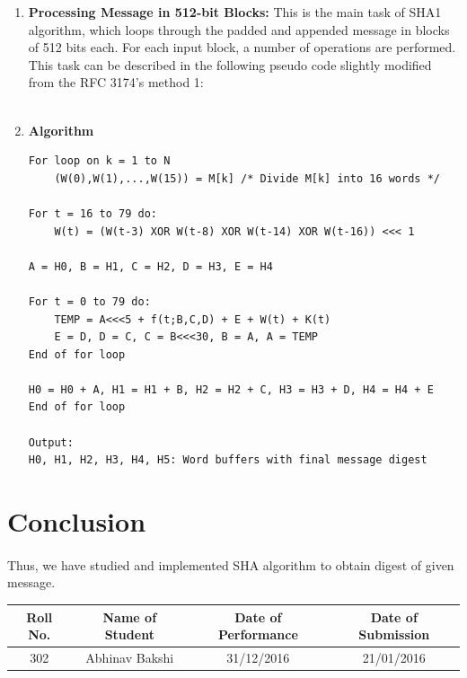 \documentclass[a4paper,12pt]{article}
\begin{document}
\begin{enumerate}
        \vspace{30px}
        
        \item \textbf{Processing Message in 512-bit Blocks:} This is the main task of SHA1 algorithm, which loops through the padded and appended message in blocks of 512 bits each. For each input block, a number of operations are performed. This task can be described in the following pseudo code slightly modified from the RFC 3174's method 1:\\\\
        
        \item \textbf{Algorithm}
	\lstset{language=Python}
\begin{lstlisting}
For loop on k = 1 to N
	(W(0),W(1),...,W(15)) = M[k] /* Divide M[k] into 16 words */

For t = 16 to 79 do:
	W(t) = (W(t-3) XOR W(t-8) XOR W(t-14) XOR W(t-16)) <<< 1

A = H0, B = H1, C = H2, D = H3, E = H4

For t = 0 to 79 do:
	TEMP = A<<<5 + f(t;B,C,D) + E + W(t) + K(t)
	E = D, D = C, C = B<<<30, B = A, A = TEMP
End of for loop

H0 = H0 + A, H1 = H1 + B, H2 = H2 + C, H3 = H3 + D, H4 = H4 + E
End of for loop

Output: 
H0, H1, H2, H3, H4, H5: Word buffers with final message digest
\end{lstlisting}
\end{enumerate} 


\section{Conclusion}
	\paragraph{} Thus, we have studied and implemented SHA algorithm to obtain digest of given message.
\vspace{20px}
\begin{center}
	\begin{tabular}
		{|c|c|c|c|}\hline
		{\bf Roll No.}		&{\bf Name of Student}		&{\bf Date of Performance}  				&{\bf Date of Submission}  \\ \hline
		{302}	&	{Abhinav Bakshi}& {31/12/2016}		&  {21/01/2016} \\ \hline
	\end{tabular}\\ 
\end{center}
\end{document}
